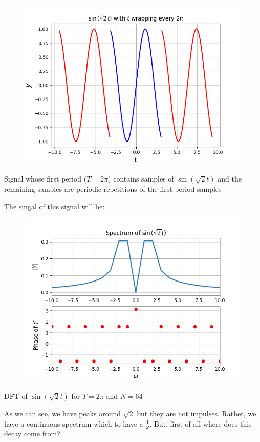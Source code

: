 \documentclass[12pt, a4paper]{article}
\begin{document}
\begin{figure}[H]
    \centering
    \includegraphics[scale = 0.8]{Figure_2.png}
    \label{fig:sample}
\end{figure}
\begin{center}
    Signal whose first period ($T = 2\pi$) contains samples of $\sin(\sqrt{2}t)$ and the remaining samples are periodic repetitions of the first-period samples
\end{center}
The singal of this signal will be:
\begin{figure}[H]
    \centering
    \includegraphics[scale = 0.8]{Figure_3.png}
    \label{fig:sample}
\end{figure}
\begin{center}
    DFT of $\sin(\sqrt{2}t)$ for $T = 2\pi$ and $N=64$
\end{center}
As we can see, we have peaks around $\sqrt{2}$ but they are not impulses. Rather, we have a continuous spectrum which to have a $\frac{1}{\omega}$. But, first of all where does this decay come from?
\end{document}
